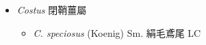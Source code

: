 
  \begin{itemize}
 \item[] \textit{Costus} 閉鞘薑屬
                                
  \begin{itemize}
        \item[] \textit{C. speciosus} (Koenig) Sm.  絹毛鳶尾   LC
  \end{itemize}
  \end{itemize}
